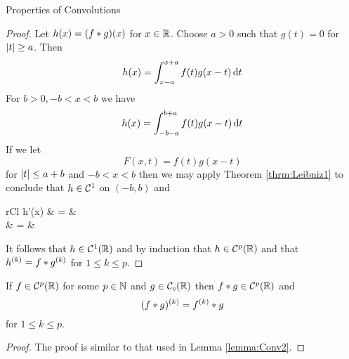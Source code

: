 \begin{section}{Properties of Convolutions}
\begin{proof}
	Let $h(x)=\convb{f}{g}{x}$ for $\isreal$. Choose $a > 0$ such that
	$g(t)=0$ for $\modulus{t} \geq a$. Then
		\begin{displaymath}
			h(x) = \myinta{x-a}{x+a}{f(t)g(x-t)}{t}
		\end{displaymath}
	For $b > 0, -b < x < b$ we have
		\begin{displaymath}
			h(x) = \myinta{-b-a}{b+a}{f(t)g(x-t)}{t}
		\end{displaymath}
	If we let
		\begin{displaymath}
			F(x,t) = f(t)g(x-t)
		\end{displaymath}
	for $\modulus{t} \leq a+b$ and $-b < x < b$ then we may apply
	Theorem \ref{thrm:Leibniz1} to conclude that $h \in \ctsdiff[1]$
	on $(-b,b)$ and
		\begin{IEEEeqnarray*}{rCl}
			h'(x) & = &  \\
			& = & 
		\end{IEEEeqnarray*}
	It follows that $h \in \ctsdiff[1](\real)$ and by induction that
	$h \in \ctsdiff[p](\real)$ and that $h^{(k)} = \conva{f}{g^{(k)}}$
	for $1 \leq k \leq p$.
\end{proof}


\begin{lemma}
	If $f \in \ctsdiff[p](\real)$ for some $\isnatrl[p]$ and $g \in
	\ctscompact$ then $\conva{f}{g} \in \ctsdiff[p](\real)$ and
		\begin{displaymath}
			(\conva{f}{g})^{(k)} = \conva{f^{(k)}}{g}
		\end{displaymath}
	for $1 \leq k \leq p$.
\end{lemma}

\begin{proof}
	The proof is similar to that used in Lemma \ref{lemma:Conv2}.
\end{proof}

\end{section}